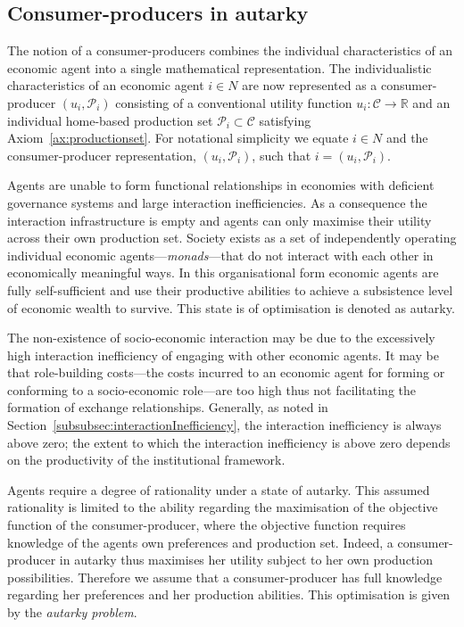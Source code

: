 \begin{subappendices}

\section{Consumer-producers in autarky}
\label{App:autarky}

The notion of a consumer-producers combines the individual characteristics of an economic agent into a single mathematical representation. The individualistic characteristics of an economic agent $i \in N$ are now represented as a consumer-producer $(u_{i}, \mathcal{P}_{i})$ consisting of a conventional utility function $u_{i} \colon \mathcal{C} \rightarrow \mathbb{R}$ and an individual home-based production set $\mathcal{P}_{i} \subset \mathcal{C}$ satisfying Axiom~\ref{ax:productionset}. For notational simplicity we equate $i \in N$ and the consumer-producer representation, $(u_{i}, \mathcal{P}_{i})$, such that $i = (u_{i}, \mathcal{P}_{i})$.

Agents are unable to form functional relationships in economies with deficient governance systems and large interaction inefficiencies. As a consequence the interaction infrastructure is empty and agents can only maximise their utility across their own production set. Society exists as a set of independently operating individual economic agents---\emph{monads}---that do not interact with each other in economically meaningful ways. In this organisational form economic agents are fully self-sufficient and use their productive abilities to achieve a subsistence level of economic wealth to survive. This state is of optimisation is denoted as autarky.

The non-existence of socio-economic interaction may be due to the excessively high interaction inefficiency of engaging with other economic agents. It may be that role-building costs---the costs incurred to an economic agent for forming or conforming to a socio-economic role---are too high thus not facilitating the formation of exchange relationships. Generally, as noted in Section~\ref{subsubsec:interactionInefficiency}, the interaction inefficiency is always above zero; the extent to which the interaction inefficiency is above zero depends on the productivity of the institutional framework.

Agents require a degree of rationality under a state of autarky. This assumed rationality is limited to the ability regarding the maximisation of the objective function of the consumer-producer, where the objective function requires knowledge of the agents own preferences and production set. Indeed, a consumer-producer in autarky thus maximises her utility subject to her own production possibilities. Therefore we assume that a consumer-producer has full knowledge regarding her preferences and her production abilities. This optimisation is given by the \emph{autarky problem}.


\end{subappendices}
